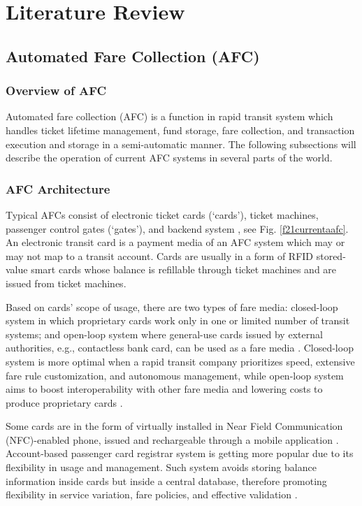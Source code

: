 \documentclass[a4paper,12pt,oneside, utf8x]{report}
\begin{document}
\chapter{Literature Review}
\label{clreview}
\section{Automated Fare Collection (AFC)}
\subsection{Overview of AFC}
Automated fare collection (AFC) is a function in rapid transit system which handles ticket lifetime management, fund storage, fare collection, and transaction execution and storage in a semi-automatic manner. The following subsections will describe the operation of current AFC systems in several parts of the world.
\subsection{AFC Architecture}
Typical AFCs consist of electronic ticket cards (‘cards’), ticket machines, passenger control gates (‘gates’), and backend system \cite{p11}, see Fig. \ref{f21currentaafc}. An electronic transit card is a payment media of an AFC system which may or may not map to a transit account. Cards are usually in a form of RFID stored-value smart cards whose balance is refillable through ticket machines and are issued from ticket machines.

Based on cards’ scope of usage, there are two types of fare media: closed-loop system in which proprietary cards work only in one or limited number of transit systems; and open-loop system where general-use cards issued by external authorities, e.g., contactless bank card, can be used as a fare media \cite{p12,p13}. Closed-loop system is more optimal when a rapid transit company prioritizes speed, extensive fare rule customization, and autonomous management, while open-loop system aims to boost interoperability with other fare media and lowering costs to produce proprietary cards \cite{p14}.

Some cards are in the form of virtually installed in Near Field Communication (NFC)-enabled phone, issued and rechargeable through a mobile application \cite{p13,p63}. Account-based passenger card registrar system is getting more popular due to its flexibility in usage and management. Such system avoids storing balance information inside cards but inside a central database, therefore promoting flexibility in service variation, fare policies, and effective validation \cite{p13}.
\end{document}

